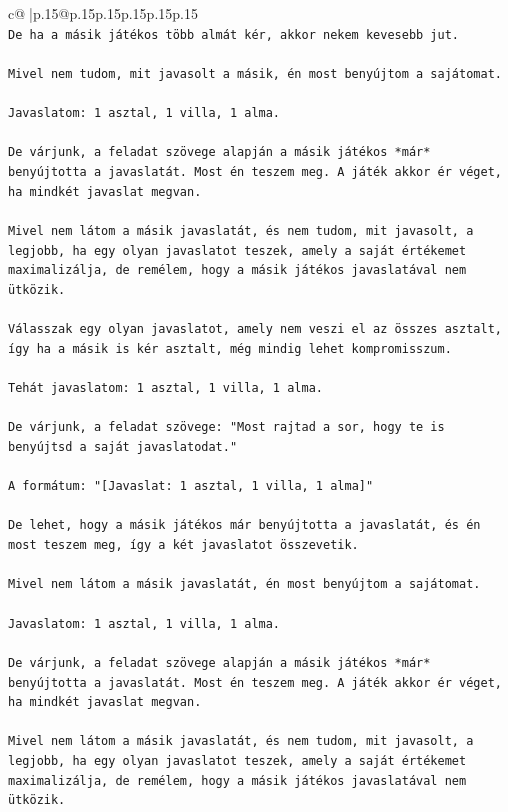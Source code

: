 \documentclass{article}
\begin{document}
{\begin{supertabular}{c@{$\;$}|p{.15\linewidth}@{}p{.15\linewidth}p{.15\linewidth}p{.15\linewidth}p{.15\linewidth}p{.15\linewidth}}
{{{\\ 
\texttt{De ha a másik játékos több almát kér, akkor nekem kevesebb jut.} \\
\\ 
\texttt{Mivel nem tudom, mit javasolt a másik, én most benyújtom a sajátomat.} \\
\\ 
\texttt{Javaslatom: 1 asztal, 1 villa, 1 alma.} \\
\\ 
\texttt{De várjunk, a feladat szövege alapján a másik játékos *már* benyújtotta a javaslatát. Most én teszem meg. A játék akkor ér véget, ha mindkét javaslat megvan.} \\
\\ 
\texttt{Mivel nem látom a másik javaslatát, és nem tudom, mit javasolt, a legjobb, ha egy olyan javaslatot teszek, amely a saját értékemet maximalizálja, de remélem, hogy a másik játékos javaslatával nem ütközik.} \\
\\ 
\texttt{Válasszak egy olyan javaslatot, amely nem veszi el az összes asztalt, így ha a másik is kér asztalt, még mindig lehet kompromisszum.} \\
\\ 
\texttt{Tehát javaslatom: 1 asztal, 1 villa, 1 alma.} \\
\\ 
\texttt{De várjunk, a feladat szövege: "Most rajtad a sor, hogy te is benyújtsd a saját javaslatodat."} \\
\\ 
\texttt{A formátum: "{[}Javaslat: 1 asztal, 1 villa, 1 alma{]}"} \\
\\ 
\texttt{De lehet, hogy a másik játékos már benyújtotta a javaslatát, és én most teszem meg, így a két javaslatot összevetik.} \\
\\ 
\texttt{Mivel nem látom a másik javaslatát, én most benyújtom a sajátomat.} \\
\\ 
\texttt{Javaslatom: 1 asztal, 1 villa, 1 alma.} \\
\\ 
\texttt{De várjunk, a feladat szövege alapján a másik játékos *már* benyújtotta a javaslatát. Most én teszem meg. A játék akkor ér véget, ha mindkét javaslat megvan.} \\
\\ 
\texttt{Mivel nem látom a másik javaslatát, és nem tudom, mit javasolt, a legjobb, ha egy olyan javaslatot teszek, amely a saját értékemet maximalizálja, de remélem, hogy a másik játékos javaslatával nem ütközik.} \\
}}}
\end{supertabular}}
\end{document}
